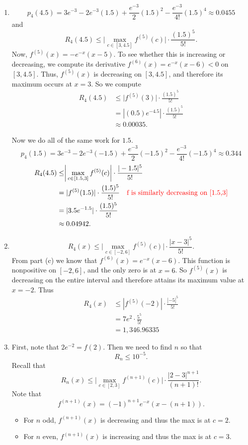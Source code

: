 \documentclass[noinstructornotes]{ximera}
\begin{document}
\begin{problem}
\begin{freeResponse}
\begin{enumerate}
	\item  
		\[
		p_4(4.5) = 3e^{-3} - 2e^{-3}(1.5) + \frac{e^{-3}}{2}(1.5)^2 - \frac{e^{-3}}{4!}(1.5)^4 \approx 0.0455
		\]
	and
		\[
		R_4(4.5) \leq \biggr| \max_{c \in [3,4.5]} f^{(5)}(c) \biggr| \cdot \frac{(1.5)^5}{5!}.
		\]
	Now, $f^{(5)}(x) = -e^{-x}(x-5)$.  
	To see whether this is increasing or decreasing, we compute its derivative $f^{(6)}(x) = e^{-x}(x-6) < 0$ on $[3,4.5]$.  
	Thus, $f^{(5)}(x)$ is decreasing on $[3,4.5]$, and therefore its maximum occurs at $x=3$.  
	So we compute
		\begin{align*}
		R_4(4.5) &\leq \biggr| f^{(5)}(3) \biggr| \cdot \frac{(1.5)^5}{5!}  \\
		&= |(0.5)e^{-4.5}| \cdot \frac{(1.5)^5}{5!}  \\
		&\approx 0.00035.
		\end{align*}
		
	Now we do all of the same work for $1.5$.  
		\[
		p_4(1.5) = 3e^{-3} - 2e^{-3}(-1.5) + \frac{e^{-3}}{2}(-1.5)^2 - \frac{e^{-3}}{4!}(-1.5)^4 \approx 0.344
		\]
		\begin{align*}
		R_4(4.5) &\leq \biggr| \max_{c \in [1.5,3]} f^{(5)}(c) \biggr| \cdot \frac{|-1.5|^5}{5!} \\
		&= | f^{(5)}(1.5) | \cdot \frac{(1.5)^5}{5!}  \quad {\color{red}\text{f is similarly decreasing on [1.5,3]}}\\
		&= | 3.5 e^{-1.5} |  \cdot \frac{(1.5)^5}{5!}  \\
		&\approx 0.04942.
		\end{align*}
	
	\item  
		\[
		R_4(x) \leq \biggr| \max_{c \in [-2,6]} f^{(5)}(c) \biggr| \cdot \frac{|x-3|^5}{5!}.
		\]
	From part (c) we know that $f^{(6)}(x) = e^{-x}(x-6)$.  
	This function is nonpositive on $[-2,6]$, and the only zero is at $x=6$.  
	So $f^{(5)}(x)$ is decreasing on the entire interval and therefore attains its maximum value at $x=-2$.  
	Thus
		\begin{align*}
		R_4(x) &\leq |f^{(5)}(-2)| \cdot \frac{|-5|^5}{5!}  \\
		&= 7e^2 \cdot \frac{5^5}{5!}  \\
		&= 1,346.96335
		\end{align*}
	
	\item  First, note that $2e^{-2} = f(2)$.  
	Then we need to find $n$ so that
		\[
		R_n \leq 10^{-5}.
		\]
	Recall that
		\[
		R_n(x) \leq \biggr| \max_{c \in [2,3]} f^{(n+1)}(c) \biggr| \cdot \frac{|2-3|^{n+1}}{(n+1)!}.
		\]
	Note that
		\[
		f^{(n+1)}(x) = (-1)^{n+1} e^{-x} (x - (n+1)).
		\]
	\begin{itemize}
	\item For $n$ odd, $f^{(n+1)}(x)$ is decreasing and thus the max is at $c=2$.
	\item For $n$ even, $f^{(n+1)}(x)$ is increasing and thus the max is at $c=3$.  
	\end{itemize}
	

\end{enumerate}
\end{freeResponse}
\end{problem}
\end{document}
